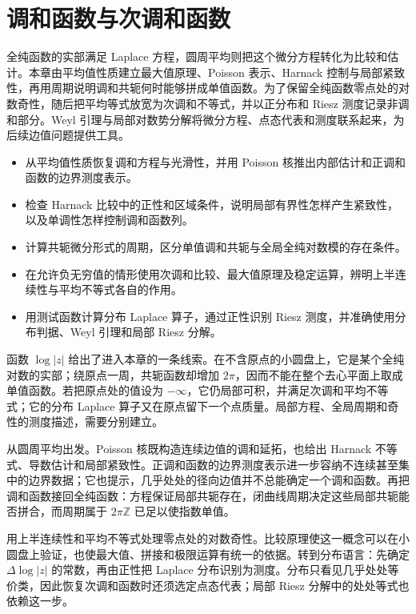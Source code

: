 \chapter{调和函数与次调和函数}
\label{b3:ch:15}
\begin{chapterabstract}
全纯函数的实部满足 Laplace 方程，圆周平均则把这个微分方程转化为比较和估计。本章由平均值性质建立最大值原理、Poisson 表示、Harnack 控制与局部紧致性，再用周期说明调和共轭何时能够拼成单值函数。为了保留全纯函数零点处的对数奇性，随后把平均等式放宽为次调和不等式，并以正分布和 Riesz 测度记录非调和部分。Weyl 引理与局部对数势分解将微分方程、点态代表和测度联系起来，为后续边值问题提供工具。
\end{chapterabstract}

\begin{learninggoals}
\begin{itemize}
\item 从平均值性质恢复调和方程与光滑性，并用 Poisson 核推出内部估计和正调和函数的边界测度表示。
\item 检查 Harnack 比较中的正性和区域条件，说明局部有界性怎样产生紧致性，以及单调性怎样控制调和函数列。
\item 计算共轭微分形式的周期，区分单值调和共轭与全局全纯对数模的存在条件。
\item 在允许负无穷值的情形使用次调和比较、最大值原理及稳定运算，辨明上半连续性与平均不等式各自的作用。
\item 用测试函数计算分布 Laplace 算子，通过正性识别 Riesz 测度，并准确使用分布判据、Weyl 引理和局部 Riesz 分解。
\end{itemize}
\end{learninggoals}

函数 \(\log|z|\) 给出了进入本章的一条线索。在不含原点的小圆盘上，它是某个全纯对数的实部；绕原点一周，共轭函数却增加 \(2\pi\)，因而不能在整个去心平面上取成单值函数。若把原点处的值设为 \(-\infty\)，它仍局部可积，并满足次调和平均不等式；它的分布 Laplace 算子又在原点留下一个点质量。局部方程、全局周期和奇性的测度描述，需要分别建立。

\ProseParagraphBreak
{}从圆周平均出发。Poisson 核既构造连续边值的调和延拓，也给出 Harnack 不等式、导数估计和局部紧致性。正调和函数的边界测度表示进一步容纳不连续甚至集中的边界数据；它也提示，几乎处处的径向边值并不总能确定一个调和函数。再把调和函数接回全纯函数：方程保证局部共轭存在，闭曲线周期决定这些局部共轭能否拼合，而周期属于 \(2\pi\mathbb Z\) 已足以使指数单值。

\ProseParagraphBreak
{}用上半连续性和平均不等式处理零点处的对数奇性。比较原理使这一概念可以在小圆盘上验证，也使最大值、拼接和极限运算有统一的依据。转到分布语言：先确定 \(\Delta\log|z|\) 的常数，再由正性把 Laplace 分布识别为测度。分布只看见几乎处处等价类，因此恢复次调和函数时还须选定点态代表；局部 Riesz 分解中的处处等式也依赖这一步。

